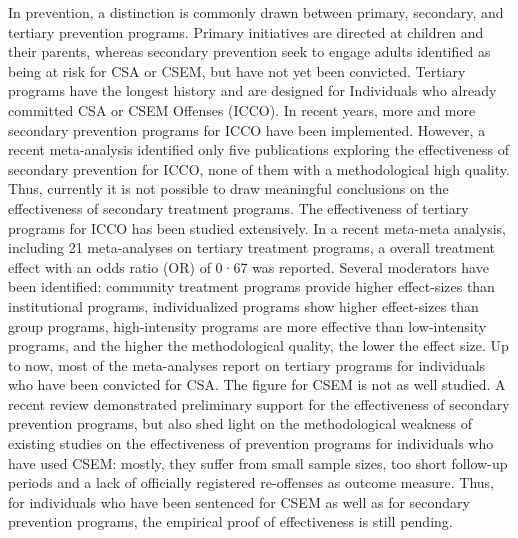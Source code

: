 \documentclass[
  super,
  preprint,
  1p,
  onecolumn]{elsarticle}
\begin{document}
In prevention, a distinction is commonly drawn between primary,
secondary, and tertiary prevention programs. Primary initiatives are
directed at children and their parents, whereas secondary prevention
seek to engage adults identified as being at risk for CSA or CSEM, but
have not yet been convicted. Tertiary programs have the longest history
and are designed for Individuals who already committed CSA or CSEM
Offenses (ICCO). \citep{kewleyPreventingChildSexual2023} In recent
years, more and more secondary prevention programs for ICCO have been
implemented. \citep{setoEvaluatingChildSexual2024} However, a recent
meta-analysis identified only five publications exploring the
effectiveness of secondary prevention for ICCO, none of them with a
methodological high quality.
\citep{kewleyPreventingChildSexual2023, setoEvaluatingChildSexual2024}
Thus, currently it is not possible to draw meaningful conclusions on the
effectiveness of secondary treatment programs.
\citep{setoEvaluatingChildSexual2024} The effectiveness of tertiary
programs for ICCO has been studied extensively. In a recent meta-meta
analysis, including 21 meta-analyses on tertiary treatment programs, a
overall treatment effect with an odds ratio (OR) of 0·67 was reported.
\citep{olverSexualOffenseTreatment2025} Several moderators have been
identified: community treatment programs provide higher effect-sizes
than institutional programs, individualized programs show higher
effect-sizes than group programs, high-intensity programs are more
effective than low-intensity programs, and the higher the methodological
quality, the lower the effect size.
\citep{holperModeratorsSexualRecidivism2024, olverSexualOffenseTreatment2025}
Up to now, most of the meta-analyses report on tertiary programs for
individuals who have been convicted for CSA. The figure for CSEM is not
as well studied. A recent review demonstrated preliminary support for
the effectiveness of secondary prevention programs, but also shed light
on the methodological weakness of existing studies on the effectiveness
of prevention programs for individuals who have used CSEM: mostly, they
suffer from small sample sizes, too short follow-up periods and a lack
of officially registered re-offenses as outcome measure.
\citep{gouveiaSystematicReviewEffectiveness2025} Thus, for individuals
who have been sentenced for CSEM as well as for secondary prevention
programs, the empirical proof of effectiveness is still pending.
\end{document}

